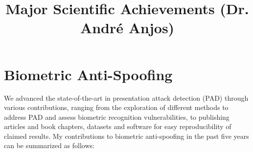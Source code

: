 \documentclass[a4paper,10pt,onecolumn]{article}
\author{}
\date{}
\begin{document}


\title{Major Scientific Achievements (Dr. André Anjos)}
\maketitle

\section{Biometric Anti-Spoofing}

We advanced the state-of-the-art in presentation attack detection (PAD) through
various contributions, ranging from the exploration of different methods to
address PAD and assess biometric recognition vulnerabilities, to publishing
articles and book chapters, datasets and software for easy reproducibility of
claimed results.  My contributions to biometric anti-spoofing in the past five
years can be summarized as follows:
\end{document}
